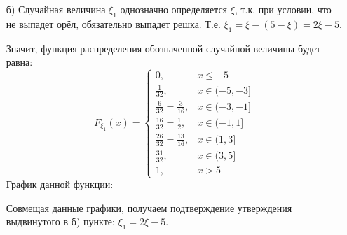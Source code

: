 \begin{enumerate}
	\item[б)] Случайная величина $\xi_1$ однозначно определяется $\xi$, т.к. при условии, что не выпадет орёл, обязательно выпадет решка. Т.е. $\xi_1 = \xi - (5 - \xi) = 2\xi - 5$.
	
	Значит, функция распределения обозначенной случайной величины будет равна:
	\[
	F_{\xi_1}(x) = 
	\begin{cases}
		0, &x \le -5 \\
		\frac{1}{32}, &x \in (-5,-3] \\
		\frac{6}{32} = \frac{3}{16}, &x \in (-3,-1] \\
		\frac{16}{32} = \frac{1}{2}, &x \in (-1,1] \\
		\frac{26}{32} = \frac{13}{16}, &x \in (1,3] \\
		\frac{31}{32}, &x \in (3,5] \\
		1, &x > 5
	\end{cases}
	\]
	График данной функции:
	\begin{figure}[H]
	\end{figure}
	
	Совмещая данные графики, получаем подтверждение утверждения выдвинутого в б) пункте: $\xi_1 = 2\xi - 5$.
	\begin{figure}[H]
	\end{figure}
\end{enumerate}

